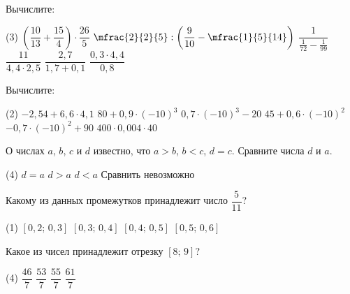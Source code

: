 \begin{homework}[number=1]
	\begin{listofex}
		\item Вычислите:
		\begin{tasks}(3)
			\task \( \left( \dfrac{10}{13}+\dfrac{15}{4} \right)\cdot\dfrac{26}{5} \)
			\task \( \mfrac{2}{2}{5}:\left( \dfrac{9}{10}-\mfrac{1}{5}{14} \right) \)
			\task \( \dfrac{1}{\frac{1}{72}-\frac{1}{99}} \)
			\task \( \dfrac{11}{4,4\cdot2,5} \)
			\task \( \dfrac{2,7}{1,7+0,1} \)
			\task \( \dfrac{0,3\cdot4,4}{0,8} \)
		\end{tasks}
		\item Вычислите:
		\begin{tasks}(2)
			\task \( -2,54+6,6\cdot4,1 \)
			\task \( 80+0,9\cdot(-10)^3 \)
			\task \( 0,7\cdot(-10)^3-20 \)
			\task \( 45+0,6\cdot(-10)^2 \)
			\task \( -0,7\cdot(-10)^2+90 \)
			\task \( 400\cdot0,004\cdot40 \)
		\end{tasks}
		\item О числах \( a \), \( b \), \( c \) и \( d \) известно, что \( a>b \), \( b<c \), \( d=c \). Сравните числа \( d \) и \( a \).
		\begin{tasks}(4)
			\task \( d=a \)
			\task \( d>a \)
			\task \( d<a \)
			\task Сравнить невозможно
		\end{tasks}
		\item Какому из данных промежутков принадлежит число \( \dfrac{5}{11} \)?
		\begin{tasks}(1)
			\task \( [0,2; \, 0,3] \)
			\task \( [0,3; \, 0,4] \)
			\task \( [0,4; \, 0,5] \)
			\task \( [0,5; \, 0,6] \)
		\end{tasks}
		\item Какое из чисел принадлежит отрезку \( [8; \, 9] \)?
		\begin{tasks}(4)
			\task \( \dfrac{46}{7} \)
			\task \( \dfrac{53}{7} \)
			\task \( \dfrac{55}{7} \)
			\task \( \dfrac{61}{7} \)
		\end{tasks}
	\end{listofex}
\end{homework}

